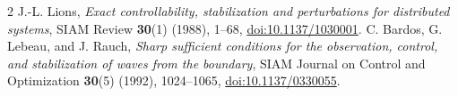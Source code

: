 \documentclass[10pt]{article}
\begin{document}
\begin{thebibliography}{2}
J.-L. Lions,
\emph{Exact controllability, stabilization and perturbations for distributed
systems}, SIAM Review \textbf{30}(1) (1988), 1--68,
\href{https://doi.org/10.1137/1030001}{doi:10.1137/1030001}.
C. Bardos, G. Lebeau, and J. Rauch,
\emph{Sharp sufficient conditions for the observation, control, and
stabilization of waves from the boundary}, SIAM Journal on Control and
Optimization \textbf{30}(5) (1992), 1024--1065,
\href{https://doi.org/10.1137/0330055}{doi:10.1137/0330055}.
\end{thebibliography}
\end{document}
